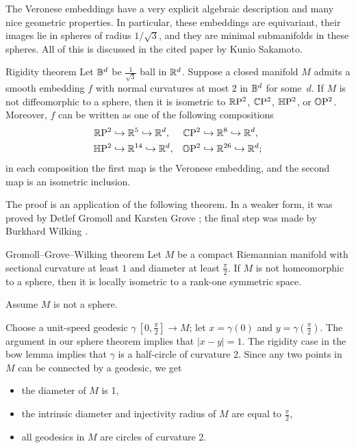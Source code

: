 \documentclass[a4paper,10pt]{article}
\begin{document}
The Veronese embeddings have a very explicit algebraic description and many nice geometric properties.
In particular,
these embeddings are equivariant,
their images lie in spheres of radius $1/\sqrt3$,
and they are minimal submanifolds in these spheres.
All of this is discussed in the cited paper by Kunio Sakamoto.
 

 

\begin{thm}{Rigidity theorem}
Let $\mathbb{B}^d$ be $\tfrac1{\sqrt{3}}$ ball in $\mathbb{R}^d$.
Suppose a closed manifold $M$ admits a smooth embedding $f$ with normal curvatures at most $2$ in $\mathbb{B}^d$ for some~$d$.
If $M$ is not diffeomorphic to a sphere, then it is isometric to $\mathbb{R}\mathrm{P}^2$, $\mathbb{C}\mathrm{P}^2$, $\mathbb{H}\mathrm{P}^2$, or $\mathbb{O}\mathrm{P}^2$.
Moreover, $f$ can be written as one of the following compositions
\begin{align*}
\mathbb{R}\mathrm{P}^2& \hookrightarrow\mathbb{R}^5 \hookrightarrow\mathbb{R}^d, 
&
\mathbb{C}\mathrm{P}^2& \hookrightarrow\mathbb{R}^8 \hookrightarrow\mathbb{R}^d,
\\
\mathbb{H}\mathrm{P}^2& \hookrightarrow\mathbb{R}^{14} \hookrightarrow\mathbb{R}^d, 
&
\mathbb{O}\mathrm{P}^2& \hookrightarrow\mathbb{R}^{26} \hookrightarrow\mathbb{R}^d;
\end{align*}
in each composition the first map is the Veronese embedding, and the second map is an isometric inclusion. 


\end{thm}

The proof is an application of the following theorem.
In a weaker form,
it was proved by Detlef Gromoll and Karsten Grove \cite{gromoll-grove};
the final step was made by Burkhard Wilking \cite{wilking}.

\begin{thm}{Gromoll--Grove--Wilking theorem}\label{thm:GGW}
Let $M$ be a compact Riemannian manifold with sectional curvature at least $1$ and
diameter at least $\tfrac\pi2$.
If $M$ is not homeomorphic to a sphere, then it is locally isometric to a rank-one symmetric space.
\end{thm}

Assume $M$ is not a sphere.

Choose a unit-speed geodesic $\gamma\:[0,\tfrac\pi2]\to M$;
let $x=\gamma(0)$ and $y=\gamma(\tfrac\pi2)$.
The argument in our sphere theorem implies that $|x-y|=1$.
The rigidity case in the bow lemma implies that $\gamma$ is a half-circle of curvature $2$.
Since any two points in $M$ can be connected by a geodesic, we get
\begin{itemize}
 \item the diameter of $M$ is 1,
 \item the intrinsic diameter and injectivity radius of $M$ are equal to $\tfrac\pi2$,
 \item all geodesics in $M$ are circles of curvature 2.
\end{itemize}
\end{document}
